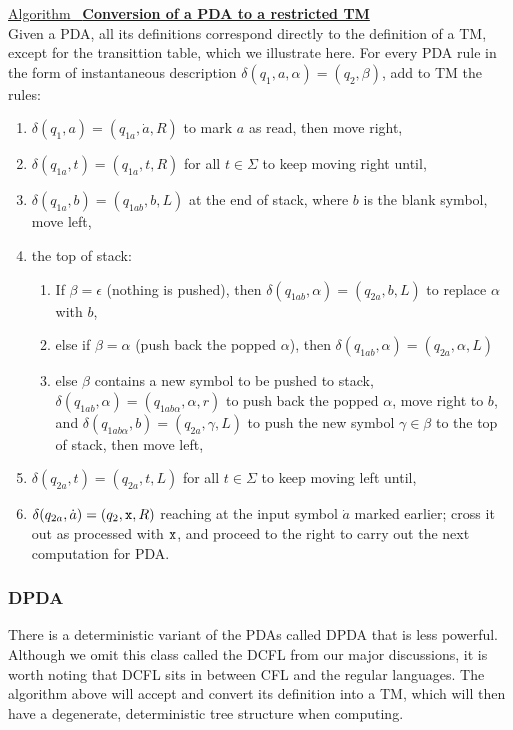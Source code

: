 \documentclass[12pt]{article}  %
\newcommand{\algtitle}[1]{\underline{Algorithm \ {\bf #1}} \vspace*{1mm}\\}
\begin{document}
\algtitle{Conversion of a PDA to a restricted TM}
Given a PDA, all its definitions correspond directly to the definition of a TM, except for the transittion table, which we illustrate here. For every PDA rule in the form of instantaneous description $\delta(q_1, a, \alpha) = (q_2, \beta)$, add to TM the rules:
\begin{enumerate}
	\item $\delta(q_1, a) = (q_{1a}, \dot a, R)$ to mark $a$ as read, then move right,
	\item $\delta(q_{1a}, t) = (q_{1a}, t, R)$ for all $t \in \Sigma$ to keep moving right until,
	\item $\delta(q_{1a}, b) = (q_{1ab}, b, L)$ at the end of stack, where $b$ is the blank symbol, move left,
	\item the top of stack:
	\begin{enumerate}
		\item If $\beta = \epsilon$ (nothing is pushed), then $\delta(q_{1ab}, \alpha) = (q_{2a}, b, L)$ to replace $\alpha$ with $b$,
		\item else if $\beta = \alpha$ (push back the popped $\alpha$), then $\delta(q_{1ab}, \alpha) = (q_{2a}, \alpha, L)$
		\item else $\beta$ contains a new symbol to be pushed to stack, $\delta(q_{1ab}, \alpha) = (q_{1ab\alpha}, \alpha, r)$ to push back the popped $\alpha$, move right to $b$, and $\delta(q_{1ab\alpha}, b) = (q_{2a}, \gamma, L)$ to push the new symbol $\gamma \in \beta$ to the top of stack, then move left,
	\end{enumerate}
	\item $\delta(q_{2a}, t) = (q_{2a}, t, L)$ for all $t \in \Sigma$ to keep moving left until,
	\item $\delta(q_{2a}, \dot a) = (q_{2}, {\tt x}, R)$ reaching at the input symbol $\dot a$ marked earlier; cross it out as processed with ${\tt x}$, and proceed to the right to carry out the next computation for PDA.	
\end{enumerate}




\subsubsection{DPDA}

There is a deterministic variant of the PDAs called DPDA that is less powerful. Although we omit this class called the DCFL from our major discussions, it is worth noting that DCFL sits in between CFL and the regular languages. The algorithm above will accept and convert its definition into a TM, which will then have a degenerate, deterministic tree structure when computing.
\end{document}
